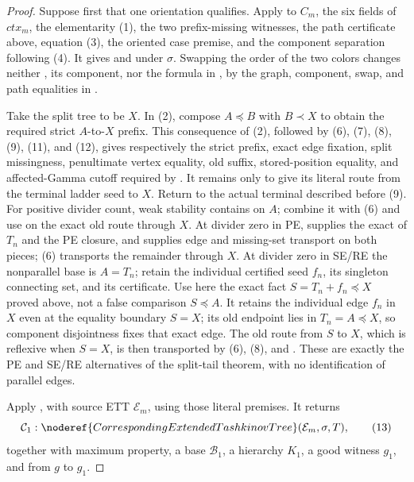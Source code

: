 \begin{proof}
Suppose first that one orientation qualifies.  Apply
 to \(C_m\), the six fields of
\(\mathit{ctx}_m\), the elementarity (1), the two prefix-missing
witnesses, the path certificate above, equation (3), the oriented case
premise, and the component separation following (4).  It gives
 and
 under \(\sigma\).  Swapping the order of the two
colors changes neither , its component,
nor the formula in , by the graph,
component, swap, and path equalities in
.

Take the split tree to be \(X\).  In (2), compose
\(A\preccurlyeq B\) with \(B\prec X\) to obtain the required strict
\(A\)-to-\(X\) prefix.  This consequence of (2), followed by (6), (7),
(8), (9), (11), and (12), gives respectively the strict prefix, exact
edge fixation, split missingness, penultimate vertex equality, old
suffix, stored-position equality, and affected-Gamma cutoff required by
.  It remains only to give its
literal route from the terminal ladder seed to \(X\).  Return to the
actual terminal  described before (9).
For positive divider count, weak stability contains
 on \(A\); combine it with (6) and use
 on the exact
old route through \(X\).  At divider zero in PE,
 supplies the exact
 of \(T_n\) and the PE closure, and
 supplies edge and missing-set
transport on both pieces; (6) transports the remainder through \(X\).
At divider zero in SE/RE the nonparallel base is \(A=T_n\); retain the
individual certified seed \(f_n\), its singleton connecting set, and its
 certificate.  Use here the exact fact
\(S=T_n+f_n\preccurlyeq X\) proved above, not a false comparison
\(S\preccurlyeq A\).  It retains the individual edge \(f_n\) in \(X\)
even at the equality boundary \(S=X\); its old endpoint lies in
\(T_n=A\preccurlyeq X\), so component disjointness fixes that exact edge.
The old route from \(S\) to \(X\), which is reflexive when \(S=X\), is
then transported by (6), (8), and
.  These are
exactly the PE and SE/RE alternatives of the split-tail theorem, with no
identification of parallel edges.

Apply , with source ETT
\(\mathcal E_m\), using those literal premises.  It returns
\[
 \mathcal C_1:
 \noderef{CorrespondingExtendedTashkinovTree}
       (\mathcal E_m,\sigma,T),                                \tag{13}
\]
together with maximum property, a base \(\mathcal B_1\), a hierarchy
\(K_1\), a good witness \(g_1\), and
 from \(g\) to \(g_1\).


\end{proof}

